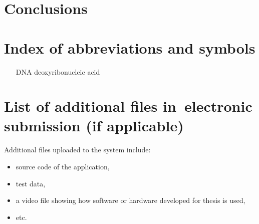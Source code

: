 \documentclass[a4paper,twoside,12pt]{book}
\newcounter{PagesWithoutNumbers}
\begin{document}
 
 

\chapter{Conclusions}





\backmatter
{}
\setcounter{page}{\value{PagesWithoutNumbers}}

\pagestyle{onlyPageNumbers}

\printbibliography           %


\begin{appendices} 


 

\chapter*{Index of abbreviations and symbols}

\begin{itemize}
\item[DNA] deoxyribonucleic acid
\end{itemize}




\chapter*{List of additional files in~electronic submission (if applicable)}

Additional files uploaded to the system include:
\begin{itemize}
\item source code of the application,
\item test data,
\item a video file showing how software or hardware developed for thesis is used,
\item etc.
\end{itemize}
 
\listoffigures
{}
\listoftables
{}

\end{appendices}
\end{document}
